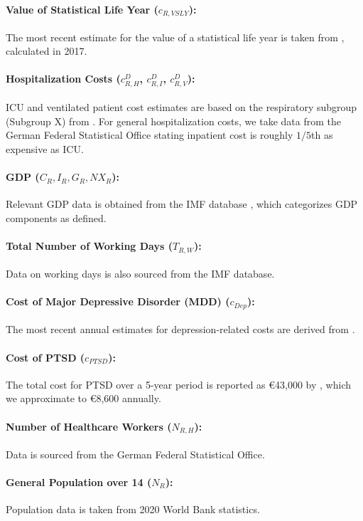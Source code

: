\documentclass[msom,blindrev]{informs3} %
\begin{document}
\begin{APPENDICES}
\paragraph{Value of Statistical Life Year ($c_{R,VSLY}$):} The most recent estimate for the value of a statistical life year is taken from , calculated in 2017.

\paragraph{Hospitalization Costs ($c^D_{R,H}$, $c^D_{R,I}$, $c^D_{R,V}$):} ICU and ventilated patient cost estimates are based on the respiratory subgroup (Subgroup X) from . For general hospitalization costs, we take data from the German Federal Statistical Office stating inpatient cost is roughly $1/5$th as expensive as ICU. 
\paragraph{GDP ($C_R, I_R, G_R, NX_R$):} Relevant GDP data is obtained from the IMF database , which categorizes GDP components as defined.
\paragraph{Total Number of Working Days ($T_{R,W}$):} Data on working days is also sourced from the IMF database.
\paragraph{Cost of Major Depressive Disorder (MDD) ($c_{Dep}$):} The most recent annual estimates for depression-related costs are derived from .
\paragraph{Cost of PTSD ($c_{PTSD}$):} The total cost for PTSD over a 5-year period is reported as \euro43,000 by , which we approximate to \euro8,600 annually.
\paragraph{Number of Healthcare Workers ($N_{R,H}$):} Data is sourced from the German Federal Statistical Office.
\paragraph{General Population over 14 ($N_{R}$):} Population data is taken from 2020 World Bank statistics.

\end{APPENDICES}
\end{document}
